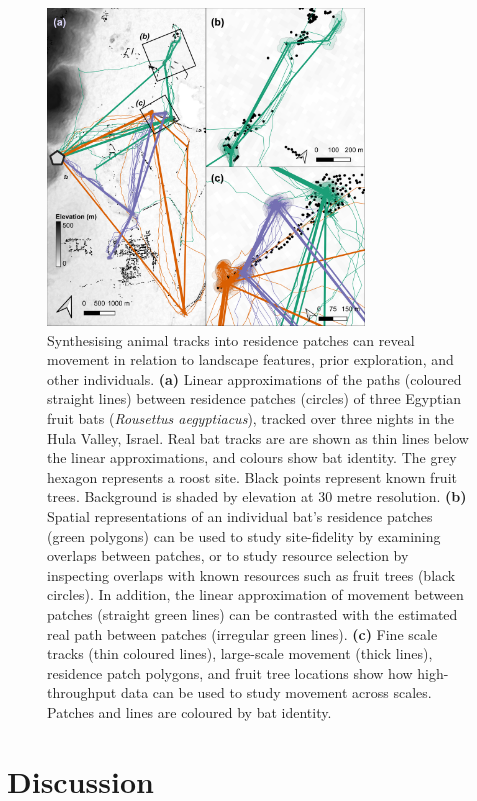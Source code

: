 \documentclass[10pt,paper=a4,headings=standardclasses
]{scrartcl}
\begin{document}
\begin{figure}[h!]
    \centering
    \includegraphics[width=0.75\textwidth]{figures/fig_07_bats.png}
    \caption{Synthesising animal tracks into residence patches can reveal movement in relation to landscape features, prior exploration, and other individuals.
    \textbf{(a)} Linear approximations of the paths (coloured straight lines) between residence patches (circles) of three Egyptian fruit bats (\textit{Rousettus aegyptiacus}), tracked over three nights in the Hula Valley, Israel.
    Real bat tracks are are shown as thin lines below the linear approximations, and colours show bat identity. The grey hexagon represents a roost site.
    Black points represent known fruit trees.
    Background is shaded by elevation at 30 metre resolution.
    \textbf{(b)} Spatial representations of an individual bat's residence patches (green polygons) can be used to study site-fidelity by examining overlaps between patches, or to study resource selection by inspecting overlaps with known resources such as fruit trees (black circles).
    In addition, the linear approximation of movement between patches (straight green lines) can be contrasted with the estimated real path between patches (irregular green lines).
    \textbf{(c)} Fine scale tracks (thin coloured lines), large-scale movement (thick lines), residence patch polygons, and fruit tree locations show how high-throughput data can be used to study movement across scales.
    Patches and lines are coloured by bat identity.}
    \label{fig:figure_bats}
\end{figure}

\section{Discussion}
\end{document}
